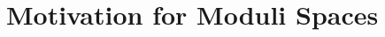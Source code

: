 \documentclass[../Moduli_Spaces_of_Riemann_Surfaces.tex]{subfiles}
\begin{document}
    \section{Motivation for Moduli Spaces}
\end{document}
